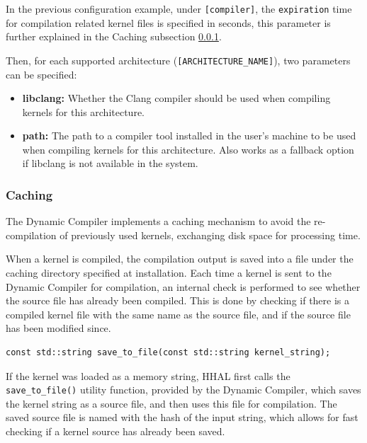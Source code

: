 In the previous configuration example, under \texttt{[compiler]}, the \texttt{expiration} time for compilation related kernel files is specified in seconds, this parameter is further explained in the Caching subsection \ref{HHAL:DynamicCompilerBinaryCaching}.

Then, for each supported architecture (\texttt{[ARCHITECTURE\_NAME]}), two parameters can be specified:
\begin{itemize}
    \item \textbf{libclang:} Whether the Clang compiler should be used when compiling kernels for this architecture.
    \item \textbf{path:} The path to a compiler tool installed in the user's machine to be used when compiling kernels for this architecture. Also works as a fallback option if libclang is not available in the system.
\end{itemize}

\subsubsection{Caching} \label{HHAL:DynamicCompilerBinaryCaching}

The Dynamic Compiler implements a caching mechanism to avoid the re-compilation of previously used kernels, exchanging disk space for processing time.

When a kernel is compiled, the compilation output is saved into a file under the caching directory specified at installation. Each time a kernel is sent to the Dynamic Compiler for compilation, an internal check is performed to see whether the source file has already been compiled. This is done by checking if there is a compiled kernel file with the same name as the source file, and if the source file has been modified since.

\begin{lstlisting}[style=CStyle, caption=HHAL Dynamic Compiler - Save kernel string to file]
const std::string save_to_file(const std::string kernel_string);
\end{lstlisting}

If the kernel was loaded as a memory string, HHAL first calls the \texttt{save\_to\_file()} utility function, provided by the Dynamic Compiler, which saves the kernel string as a source file, and then uses this file for compilation. The saved source file is named with the hash of the input string, which allows for fast checking if a kernel source has already been saved.

